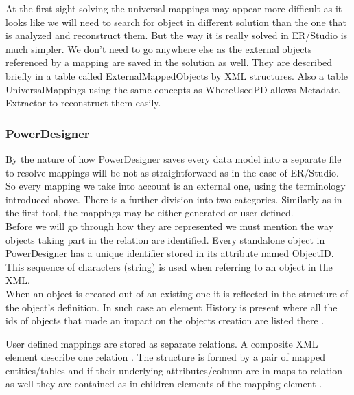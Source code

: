 At the first sight solving the universal mappings may appear more difficult as it looks like we will need to search for object in different solution than the one that is analyzed and reconstruct them. But the way it is really solved in ER/Studio is much simpler. We don't need to go anywhere else as the external objects referenced by a mapping are saved in the solution as well. They are described briefly in a table called External\textunderscore Mapped\textunderscore Objects by XML structures.
Also a table Universal\textunderscore Mappings using the same concepts as Where\textunderscore Used\textunderscore PD allows Metadata Extractor to reconstruct them easily.

\subsubsection{PowerDesigner}

By the nature of how PowerDesigner saves every data model into a separate file to resolve mappings will be not as straightforward as in the case of ER/Studio.
So every mapping we take into account is an external one, using the terminology introduced above. There is a further division into two categories. Similarly as in the first tool, the mappings may be either generated or user-defined. \\ 

Before we will go through how they are represented we must mention the way objects taking part in the relation are identified.
Every standalone object in PowerDesigner has a unique identifier stored in its attribute named ObjectID. This sequence of characters (string) is used when referring to an object in the XML.\\

When an object is created out of an existing one it is reflected in the structure of the object's definition. In such case an element History is present where all the ids of objects that made an impact on the objects creation are listed there .

User defined mappings are stored as separate relations. A composite XML element describe one relation . The structure is formed by a pair of mapped entities/tables  and if their underlying attributes/column are in maps-to relation as well they are contained as in children elements of the mapping element .

